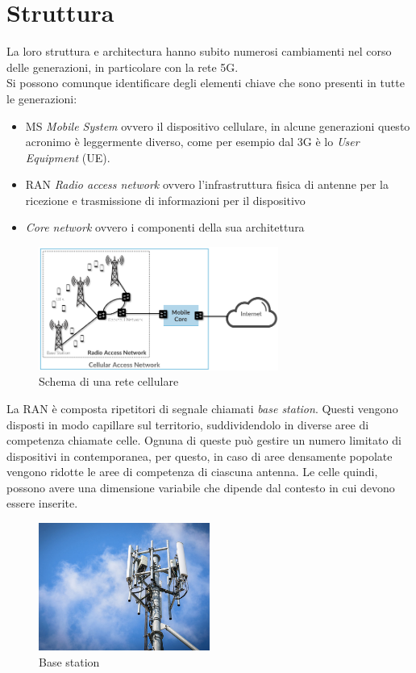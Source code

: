 \section{Struttura}
La loro struttura e architectura hanno subito numerosi cambiamenti nel corso delle generazioni, in particolare con la rete
5G.\\
Si possono comunque identificare degli elementi chiave che sono presenti in tutte le generazioni:
\begin{itemize}
    \item MS \textit{Mobile System} ovvero il dispositivo cellulare, in alcune generazioni questo acronimo è leggermente diverso, come per esempio dal 3G è
    lo \textit{User Equipment} (UE).
    \item RAN \textit{Radio access network} ovvero l'infrastruttura fisica di antenne per la ricezione e trasmissione di informazioni per il dispositivo
    \item \textit{Core network} ovvero i componenti della sua architettura
\end{itemize}
\begin{figure}[h]
    \centering
    \includegraphics[width=0.7\textwidth]{images/cellular-network-basic-scheme.png}
    \caption{Schema di una rete cellulare}
\end{figure}
La RAN è composta ripetitori di segnale chiamati \textit{base station}. 
Questi vengono disposti in modo capillare sul territorio, suddividendolo in diverse aree di competenza chiamate celle. Ognuna di queste può gestire
un numero limitato di dispositivi in contemporanea, per questo, in caso di aree densamente popolate vengono 
ridotte le aree di competenza di ciascuna antenna. Le celle quindi, possono avere una dimensione variabile che dipende dal contesto in cui devono essere inserite.
\begin{figure}[h]
    \centering
    \includegraphics[width=0.5\textwidth]{images/base-station.jpg}
    \caption{Base station}
\end{figure}\\
